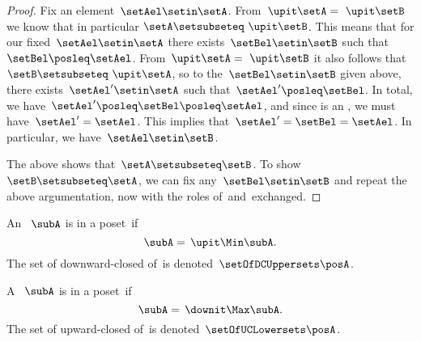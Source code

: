 \begin{proof}
    Fix an element~$\setAel \setin \setA$.
    From~$\upit \setA = \ \upit \setB$ we know that in particular $\setA \setsubseteq \ \upit \setB$.
    This means that for our fixed~$\setAel \setin \setA$ there exists~$\setBel \setin \setB$ such that~$\setBel \posleq \setAel$.
    From~$\upit \setA = \ \upit \setB$ it also follows that~$\setB \setsubseteq \ \upit \setA$, so to the~$\setBel \setin \setB$ given above, there exists~$\setAel' \setin \setA$ such that~$\setAel' \posleq \setBel$.
    In total, we have~$\setAel' \posleq \setBel \posleq \setAel$, and since \setA is an , we must have~$\setAel' = \setAel$.
    This implies that~$\setAel' = \setBel = \setAel$.
    In particular, we have~$\setAel \setin \setB$.

    The above shows that~$\setA \setsubseteq \setB$.
    To show~$\setB \setsubseteq \setA$, we can fix any~$\setBel \setin \setB$ and repeat the above argumentation, now with the roles of~\setA and~\setB exchanged.
\end{proof}

\begin{definition}
    \label{def:downward-closed-upperset}
    An ~$\subA$ is  in a poset~\posA if
    \begin{equation}
        \subA =\, \upit \Min \subA.
    \end{equation}
    The set of downward-closed  of~\posA is denoted~$\setOfDCUppersets \posA$.

\end{definition}

\begin{definition}
    \label{def:upward-closed-lowerset}
    A ~$\subA$ is  in a poset~\posA if
    \begin{equation}
        \subA =\, \downit \Max \subA.
    \end{equation}
    The set of upward-closed  of~\posA is denoted~$\setOfUCLowersets \posA$.
\end{definition}
